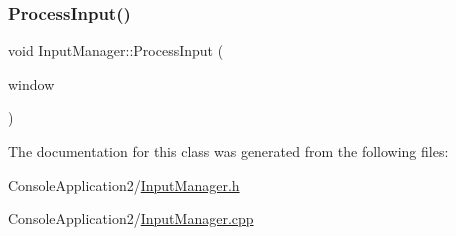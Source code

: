 \subsubsection{\texorpdfstring{Process\+Input()}{ProcessInput()}}
{\footnotesize\ttfamily void Input\+Manager\+::\+Process\+Input (\begin{DoxyParamCaption}\item[{sf\+::\+Render\+Window $\ast$}]{window }\end{DoxyParamCaption})}



The documentation for this class was generated from the following files\+:\begin{DoxyCompactItemize}
\item 
Console\+Application2/\hyperlink{_input_manager_8h}{Input\+Manager.\+h}\item 
Console\+Application2/\hyperlink{_input_manager_8cpp}{Input\+Manager.\+cpp}\end{DoxyCompactItemize}
